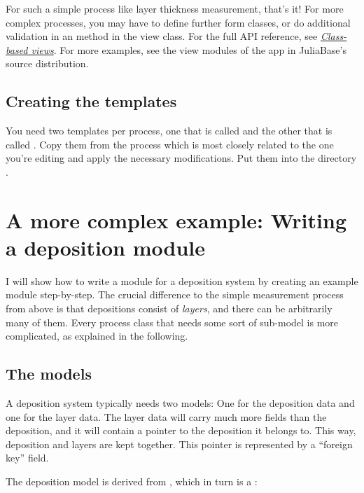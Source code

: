 \documentclass[a4paper,11pt,english]{sphinxmanual}
\begin{document}
For such a simple process like layer thickness measurement, that's it!  For
more complex processes, you may have to define further form classes, or do
additional validation in an  method in the
view class.  For the full API reference, see {\hyperref[programming/class-based_views::doc]{\emph{Class-based views}}}.  For
more examples, see the view modules of the  app in JuliaBase's
source distribution.


\subsection{Creating the templates}
\label{programming/programming:index-10}\label{programming/programming:creating-the-templates}
You need two templates per process, one that is called
 and the other that is called
.  Copy them from the process which is most
closely related to the one you're editing and apply the necessary
modifications.  Put them into the directory
.


\section{A more complex example: Writing a deposition module}
\label{programming/programming:a-more-complex-example-writing-a-deposition-module}
I will show how to write a module for a deposition system by creating an
example module step-by-step.  The crucial difference to the simple measurement
process from above is that depositions consist of \emph{layers}, and there can be
arbitrarily many of them.  Every process class that needs some sort of
sub-model is more complicated, as explained in the following.


\subsection{The models}
\label{programming/programming:the-models}
A deposition system typically needs two models: One for the deposition data and
one for the layer data.  The layer data will carry much more fields than the
deposition, and it will contain a pointer to the deposition it belongs to.
This way, deposition and layers are kept together.  This pointer is represented
by a “foreign key” field.

The deposition model is derived from ,
which in turn is a :
\end{document}
